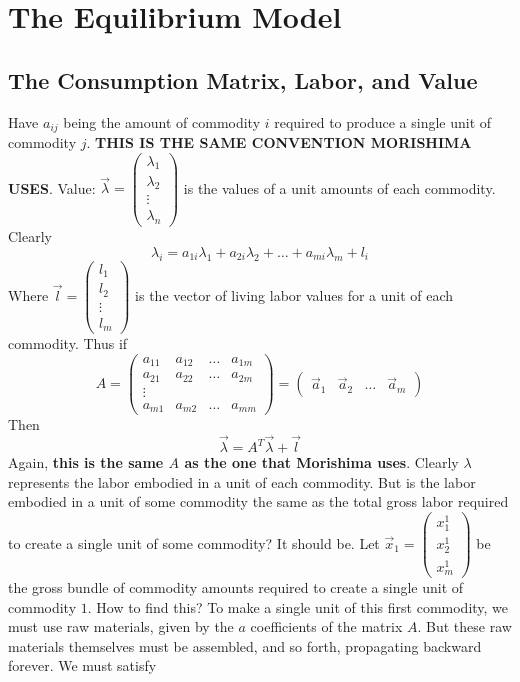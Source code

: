 \section{The Equilibrium Model}
\subsection{The Consumption Matrix, Labor, and Value}
	Have $a_{ij}$ being the amount of commodity $i$ required to produce a single unit of commodity $j$. \textbf{THIS IS THE SAME CONVENTION MORISHIMA USES}. Value: $\vec{\lambda} = \begin{pmatrix} \lambda_1 \\ \lambda_2 \\ \vdots \\ \lambda_n \end{pmatrix}$ is the values of a unit amounts of each commodity. Clearly 
	\[ \lambda_i = a_{1i}\lambda_1 + a_{2i}\lambda_2 + \ldots + a_{mi}\lambda_m + l_i \]
Where $\vec{l} = \begin{pmatrix} l_1 \\ l_2 \\ \vdots \\ l_m \end{pmatrix}$ is the vector of living labor values for a unit of each commodity. Thus if 
\[ A = \begin{pmatrix} a_{11} & a_{12} & \ldots & a_{1m} \\
						a_{21} & a_{22} & \ldots & a_{2m} \\
						\vdots \\
						a_{m1} & a_{m2} & \ldots & a_{mm}  \end{pmatrix}
						= \begin{pmatrix} \vec{a}_1 & \vec{a}_2 & \ldots & \vec{a}_m \end{pmatrix} \]
Then 
\[ \vec{\lambda} = A^T\vec{\lambda} + \vec{l} \]
Again, \textbf{this is the same $A$ as the one that Morishima uses}. Clearly $\lambda$ represents the labor embodied in a unit of each commodity. But is the labor embodied in a unit of some commodity the same as the total gross labor required to create a single unit of some commodity? It should be. Let $\vec{x}_1 = \begin{pmatrix} x^1_1 \\ x^1_2 \\ x^1_m \end{pmatrix}$ be the gross bundle of commodity amounts required to create a single unit of commodity $1$. How to find this? To make a single unit of this first commodity, we must use raw materials, given by the $a$ coefficients of the matrix $A$. But these raw materials themselves must be assembled, and so forth, propagating backward forever. We must satisfy
